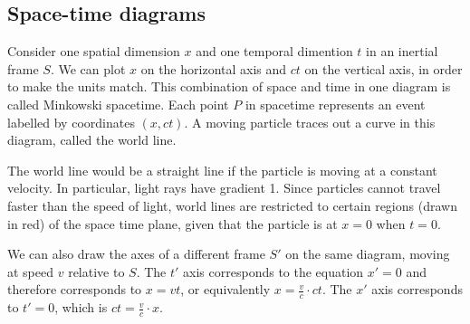 \subsection{Space-time diagrams}
Consider one spatial dimension \(x\) and one temporal dimention \(t\) in an inertial frame \(S\).
We can plot \(x\) on the horizontal axis and \(ct\) on the vertical axis, in order to make the units match.
This combination of space and time in one diagram is called Minkowski spacetime.
Each point \(P\) in spacetime represents an event labelled by coordinates \((x, ct)\).
A moving particle traces out a curve in this diagram, called the world line.
\begin{center}
\end{center}
The world line would be a straight line if the particle is moving at a constant velocity.
In particular, light rays have gradient 1.
Since particles cannot travel faster than the speed of light, world lines are restricted to certain regions (drawn in red) of the space time plane, given that the particle is at \(x=0\) when \(t=0\).
\begin{center}
\end{center}
We can also draw the axes of a different frame \(S'\) on the same diagram, moving at speed \(v\) relative to \(S\).
The \(t'\) axis corresponds to the equation \(x'=0\) and therefore corresponds to \(x=vt\), or equivalently \(x = \frac{v}{c} \cdot ct\).
The \(x'\) axis corresponds to \(t'=0\), which is \(ct = \frac{v}{c}\cdot x\).
